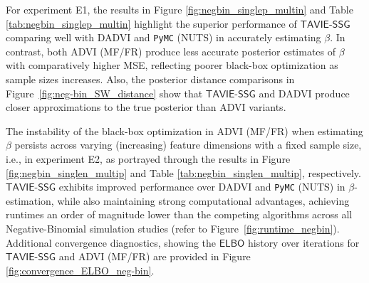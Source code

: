 \documentclass[12pt]{article}
\numberwithin{equation}{section}
\newcommand{\tssg}{\mathsf{TAVIE}\text{-}\mathsf{SSG}}
\begin{document}
For experiment E1, the results in Figure \ref{fig:negbin_singlep_multin} and Table \ref{tab:negbin_singlep_multin} highlight the superior performance of $\tssg$ comparing well with DADVI and \texttt{PyMC} (NUTS) in accurately estimating $\beta$. In contrast, both ADVI (MF/FR) produce less accurate posterior estimates of $\beta$ with comparatively higher MSE, reflecting poorer black-box optimization as sample sizes increases. Also, the posterior distance comparisons in Figure~\ref{fig:neg-bin_SW_distance} show that $\tssg$ and DADVI produce closer approximations to the true posterior than ADVI variants.

The instability of the black-box optimization in ADVI (MF/FR) when estimating $\beta$ persists across varying (increasing) feature dimensions with a fixed sample size, i.e., in experiment E2, as portrayed through the results in Figure \ref{fig:negbin_singlen_multip} and Table \ref{tab:negbin_singlen_multip}, respectively. $\tssg$ exhibits improved performance over DADVI and \texttt{PyMC} (NUTS) in $\beta$-estimation, while also maintaining strong computational advantages, achieving runtimes an order of magnitude lower than the competing algorithms across all Negative-Binomial simulation studies (refer to Figure~\ref{fig:runtime_negbin}). Additional convergence diagnostics, showing the $\mathsf{ELBO}$ history over iterations for $\tssg$ and ADVI (MF/FR) are provided in Figure \ref{fig:convergence_ELBO_neg-bin}.
\end{document}
